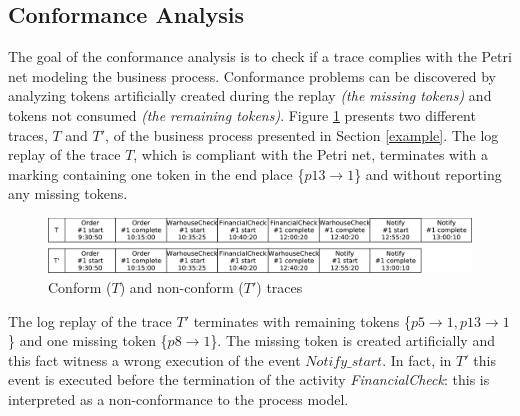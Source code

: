\documentclass{llncs}
\begin{document}

\subsection{Conformance Analysis}\label{ConformanceAnalysis}
The goal of the conformance analysis is to check if a trace complies with the Petri net modeling the business process. Conformance problems can be discovered by analyzing tokens artificially created during the replay {\itshape (the missing tokens)} and tokens not consumed {\itshape (the remaining tokens)}. Figure \ref{ConfLog}  presents two different traces, $T$ and $T'$, of the business process presented in Section \ref{example}. The log replay of the trace $T$, which is compliant with the Petri net, terminates with a marking containing one token in the end place \{${p13 \rightarrow 1}$\} and without reporting any missing tokens.

\begin{figure}[h]
\centering
\includegraphics[width=0.9\linewidth]
{./items/logConforme.pdf}
\caption{Conform ($T$) and non-conform ($T'$) traces}
\label{ConfLog}
\end{figure}


The log replay of the trace $T'$ terminates with remaining tokens \{${p5 \rightarrow 1,p13 \rightarrow 1}$\} and one missing token \{${p8 \rightarrow 1}$\}. The missing token is created artificially and this fact witness a wrong execution of the event $Notify\_start$. In fact, in $T'$ this event is executed before the termination of the activity \emph{FinancialCheck}: this is interpreted as a non-conformance to the process model. 
\end{document}
